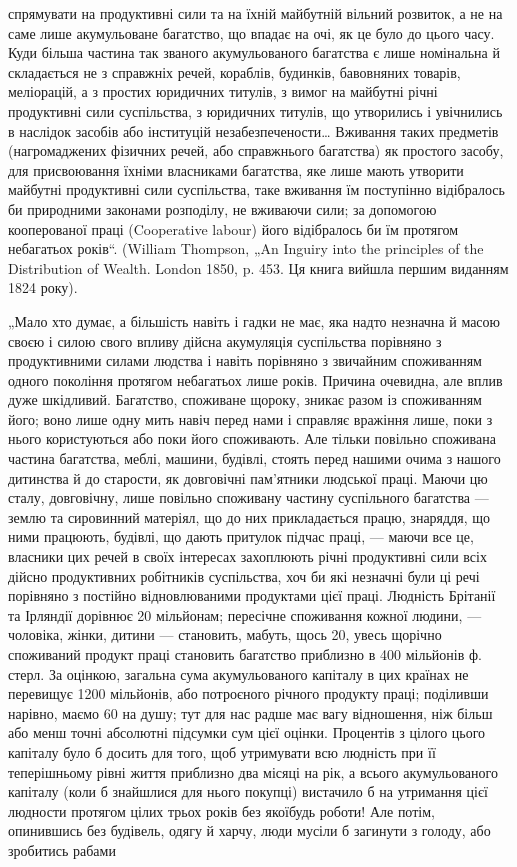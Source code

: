 \parcont{}  %
спрямувати на продуктивні сили та на їхній майбутній вільний розвиток,
а не на саме лише акумульоване багатство, що впадає на очі, як це
було до цього часу. Куди більша частина так званого акумульованого
багатства є лише номінальна й складається не з справжніх речей, кораблів,
будинків, бавовняних товарів, меліорацій, а з простих юридичних
титулів, з вимог на майбутні річні продуктивні сили суспільства, з юридичних
титулів, що утворились і увічнились в наслідок засобів або
інституцій незабезпечености\dots{} Вживання таких предметів (нагромаджених
фізичних речей, або справжнього багатства) як простого
засобу, для присвоювання їхніми власниками багатства, яке лише мають
утворити майбутні продуктивні сили суспільства, таке вживання їм поступінно
відібралось би природними законами розподілу, не вживаючи
сили; за допомогою кооперованої праці (Cooperative labour) його
відібралось би їм протягом небагатьох років“. (William Thompson, „An
Inguiry into the principles of the Distribution of Wealth. London 1850, p. 453.
Ця книга вийшла першим виданням 1824 року).

„Мало хто думає, а більшість навіть і гадки не має, яка надто
незначна й масою своєю і силою свого впливу дійсна акумуляція суспільства
порівняно з продуктивними силами людства і навіть порівняно
з звичайним споживанням одного покоління протягом небагатьох лише
років. Причина очевидна, але вплив дуже шкідливий. Багатство, споживане
щороку, зникає разом із споживанням його; воно лише одну мить
навіч перед нами і справляє вражіння лише, поки з нього користуються
або поки його споживають. Але тільки повільно споживана частина
багатства, меблі, машини, будівлі, стоять перед нашими очима з нашого
дитинства й до старости, як довговічні пам’ятники людської праці.
Маючи цю сталу, довговічну, лише повільно споживану частину суспільного
багатства — землю та сировинний матеріял, що до них прикладається
працю, знаряддя, що ними працюють, будівлі, що дають притулок підчас
праці, — маючи все це, власники цих речей в своїх інтересах захоплюють
річні продуктивні сили всіх дійсно продуктивних робітників суспільства,
хоч би які незначні були ці речі порівняно з постійно відновлюваними
продуктами цієї праці. Людність Брітанії та Ірляндії дорівнює 20 мільйонам;
пересічне споживання кожної людини, — чоловіка, жінки, дитини —
становить, мабуть, щось 20, увесь щорічно споживаний продукт
праці становить багатство приблизно в 400 мільйонів ф. стерл. За оцінкою,
загальна сума акумульованого капіталу в цих країнах не перевищує
1200 мільйонів, або потроєного річного продукту праці; поділивши
нарівно, маємо 60 на душу; тут для нас радше має вагу відношення,
ніж більш або менш точні абсолютні підсумки сум цієї оцінки.
Процентів з цілого цього капіталу було б досить для того, щоб утримувати
всю людність при її теперішньому рівні життя приблизно два
місяці на рік, а всього акумульованого капіталу (коли б знайшлися для
нього покупці) вистачило б на утримання цієї людности протягом цілих
трьох років без якоїбудь роботи! Але потім, опинившись без будівель,
одягу й харчу, люди мусіли б загинути з голоду, або зробитись рабами
\parbreak{}  %
